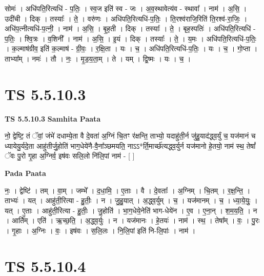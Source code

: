 \documentclass[17pt]{extarticle}
\begin{document}
सोमः॑ । अधि॑पति॒रित्यधि॑ - प॒तिः॒ । स्व॒ज इति॑ स्व - जः । अ॒व॒स्थावेत्य॑व - स्थावा᳚ । नाम॑ । अ॒सि॒ । उदी॑ची । दिक् । तस्याः᳚ । ते॒ । वरु॑णः । अधि॑पति॒रित्यधि॑-प॒तिः॒ । ति॒रश्व॑राजि॒रिति॑ ति॒रश्व॑-रा॒जिः॒ । अधि॑प॒त्नीत्यधि॑-प॒त्नी॒ । नाम॑ । अ॒सि॒ । बृ॒ह॒ती । दिक् । तस्याः᳚ । ते॒ । बृह॒स्पतिः॑ । अधि॑पति॒रित्यधि॑ - प॒तिः॒ । श्वि॒त्रः । व॒शिनी᳚ । नाम॑ । अ॒सि॒ । इ॒यं । दिक् । तस्याः᳚ । ते॒ । य॒मः । अधि॑पति॒रित्यधि॑-प॒तिः॒ । क॒ल्माष॑ग्रीव॒ इति॑ क॒ल्माष॑ - ग्री॒वः॒ । र॒क्षि॒ता । यः । च॒ । अधि॑पति॒रित्यधि॑-प॒तिः॒ । यः । च॒ । गो॒प्ता । ताभ्या᳚म् । नमः॑ । तौ । नः॒ । मृ॒ड॒य॒ता॒म् । ते । यम् । द्वि॒ष्मः । यः । च॒ ।  \newline




\section*{ TS 5.5.10.3 }

\textbf{TS 5.5.10.3 } \newline
\textbf{Samhita Paata} \newline

नो॒ द्वेष्टि॒ तं ॅवां॒ जंभे॑ दधाम्ये॒ता वै दे॒वता॑ अ॒ग्निं चि॒तꣳ र॑क्षन्ति॒ ताभ्यो॒ यदाहु॑ती॒र्न जु॑हु॒याद॑द्ध्व॒र्युं च॒ यज॑मानं च ध्यायेयु॒र्यदे॒ता आहु॑तीर्जु॒होति॑ भाग॒धेये॑नै-वै॒ना᳚ञ्छमयति॒ नाऽऽ*र्ति॒मार्च्छ॑त्यद्ध्व॒र्युर्न यज॑मानो हे॒तयो॒ नाम॑ स्थ॒ तेषां᳚ ॅवः पु॒रो गृ॒हा अ॒ग्निर्व॒ इष॑वः सलि॒लो नि॑लि॒पां नाम॑ - [  ] \newline

\textbf{Pada Paata} \newline

नः॒ । द्वेष्टि॑ । तम् । वा॒म् । जम्भे᳚ । द॒धा॒मि॒ । ए॒ताः । वै । दे॒वताः᳚ । अ॒ग्निम् । चि॒तम् । र॒क्ष॒न्ति॒ । ताभ्यः॑ । यत् । आहु॑ती॒रित्या - हु॒तीः॒ । न । जु॒हु॒यात् । अ॒द्ध्व॒र्युम् । च॒ । यज॑मानम् । च॒ । ध्या॒ये॒युः॒ । यत् । ए॒ताः । आहु॑ती॒रित्या - हु॒तीः॒ । जु॒होति॑ । भा॒ग॒धेये॒नेति॑ भाग-धेये॑न । ए॒व । ए॒ना॒न् । श॒म॒य॒ति॒ । न । आर्ति᳚म् । एति॑ । ऋ॒च्छ॒ति॒ । अ॒द्ध्व॒र्युः । न । यज॑मानः । हे॒तयः॑ । नाम॑ । स्थ॒ । तेषा᳚म् । वः॒ । पु॒रः । गृ॒हाः । अ॒ग्निः । वः॒ । इष॑वः । स॒लि॒लः । नि॒लि॒पां इति॑ नि-लि॒पांः । नाम॑ ।  \newline




\section*{ TS 5.5.10.4 }
\end{document}

